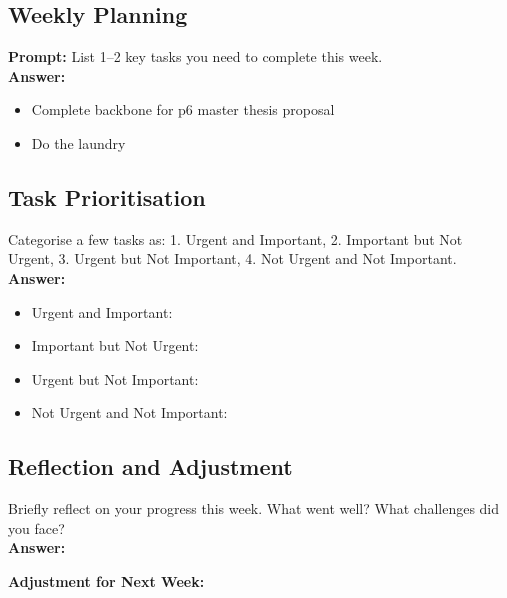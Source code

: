 \documentclass[a4paper,12pt]{article}
\begin{document}
\subsection*{Weekly Planning}
\textbf{Prompt:} List 1–2 key tasks you need to complete this week.\\
\textbf{Answer:}
\begin{itemize}
    \item Complete backbone for p6 master thesis proposal
    \item Do the laundry 
\end{itemize}

\subsection*{Task Prioritisation}
 Categorise a few tasks as: 1. Urgent and Important, 2. Important but Not Urgent, 3. Urgent but Not Important, 4. Not Urgent and Not Important.\\
\textbf{Answer:}
\begin{itemize}
    \item Urgent and Important: 
    \item Important but Not Urgent: 
    \item Urgent but Not Important: 
    \item Not Urgent and Not Important: 
\end{itemize}

\subsection*{Reflection and Adjustment}
Briefly reflect on your progress this week. What went well? What challenges did you face?\\
\textbf{Answer:} 

\noindent
\textbf{Adjustment for Next Week:} 
\end{document}
